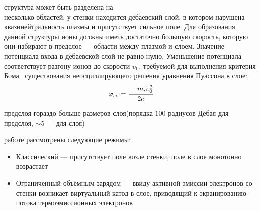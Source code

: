  структура может быть разделена на \\несколько областей: у стенки находится дебаевский слой, в котором нарушена квазинейтральность плазмы
и присутствует сильное поле. Для образования данной структуры ионы должны иметь достаточно большую скорость, которую они набирают
в предслое --- области между плазмой и слоем. 
Значение потенциала входа в дебаевской слой не равно нулю. Уменьшение потенциала соответствует разгону 
ионов до скорости $\upsilon_0$, требуемой для выполнения критерия Бома~\cite{stangeby2000plasma}
существования неосциллирующего решения уравнения Пуассона в слое:
\begin{equation}
	\varphi_{se} = \cfrac{-m_i\upsilon_0^2}{2e}
	\label{eq::Bohm}
\end{equation}

 предслоя гораздо больше размеров слоя(порядка $100$ радиусов Дебая для предслоя, $\sim 5$ --- для слоя)

 работе рассмотрены следующие режимы:
\begin{itemize}
    \item Классический --- присутствует поле возле стенки, поле в слое монотонно возрастает
    \item Ограниченный объёмным зарядом --- ввиду активной эмиссии электронов со стенки возникает виртуальный катод в слое, приводящий к экранированию потока термоэмиссионных электронов
\end{itemize}

